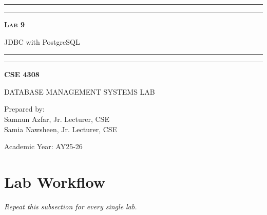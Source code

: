 \documentclass[12pt,a4paper]{article}
\newcommand{\labNo}{Lab 9}
\newcommand{\labTopic}{JDBC with PostgreSQL}
\newcommand{\courseCode}{CSE 4308}
\newcommand{\courseTitleLong}{DATABASE MANAGEMENT SYSTEMS LAB}
\newcommand{\instructorName}{Samnun Azfar, Jr. Lecturer, CSE\\ Samia Nawsheen, Jr. Lecturer, CSE}
\newcommand{\academicYear}{AY25-26}
\begin{document}
\begin{titlepage}
    \centering
    \vspace*{2\baselineskip}

    \rule{14cm}{2pt}\vspace*{-0.8\baselineskip}\vspace*{1.5pt}
    \rule{14cm}{0.5pt}\vspace{2\baselineskip}

    {\Huge\bfseries\scshape \labNo\par} %
    \vspace{3mm}
    {\Large \labTopic} %
    \vspace{3mm}

    \rule{14cm}{0.5pt}\vspace*{-0.7\baselineskip}\vspace{2.5pt}
    \rule{14cm}{2pt}

    \vspace{2\baselineskip}

    {\Large\bfseries \courseCode\par} %
    \vspace{1\baselineskip}
    {\large \courseTitleLong\par} %

    \vfill
    {\normalsize Prepared by:\\ \instructorName\par} %
    {\normalsize Academic Year: \academicYear\par} %
\end{titlepage}

\newpage
\tableofcontents
\newpage

\section{Lab Workflow}



\textit{Repeat this subsection for every single lab.}
\end{document}
